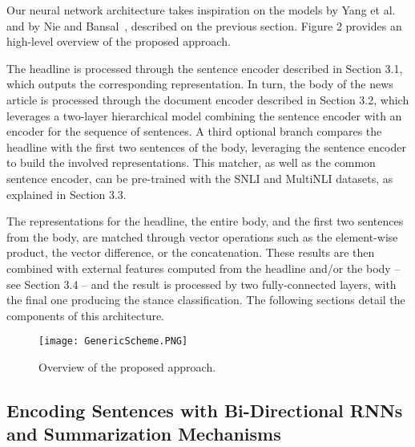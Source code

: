 Our neural network architecture takes inspiration on the models by Yang et al.~\cite{hierarchical} and by Nie and Bansal~\cite{shortcut}, described on the previous section. Figure 2 provides an high-level overview of the proposed approach. 

The headline is processed through the sentence encoder described in Section 3.1, which outputs the corresponding representation. In turn, the body of the news article is processed through the document encoder described in Section 3.2, which leverages a two-layer hierarchical model combining the sentence encoder with an encoder for the sequence of sentences. A third optional branch compares the headline with the first two sentences of the body, leveraging the sentence encoder to build the involved representations. This matcher, as well as the common sentence encoder, can be pre-trained with the SNLI and MultiNLI datasets, as explained in Section 3.3.

The representations for the headline, the entire body, and the first two sentences from the body, are matched through vector operations such as the element-wise product, the vector difference, or the concatenation. These results are then combined with external features computed from the headline and/or the body -- see Section 3.4 -- and the result is processed by two fully-connected layers, with the final one producing the stance classification. The following sections detail the components of this architecture.

\begin{figure}[t]
  \begin{center}
  \texttt{[image: GenericScheme.PNG]}
  \caption{Overview of the proposed approach.}
  \label{fig:baseline}
  \end{center}
\end{figure}

\subsection{Encoding Sentences with Bi-Directional RNNs and Summarization Mechanisms}

